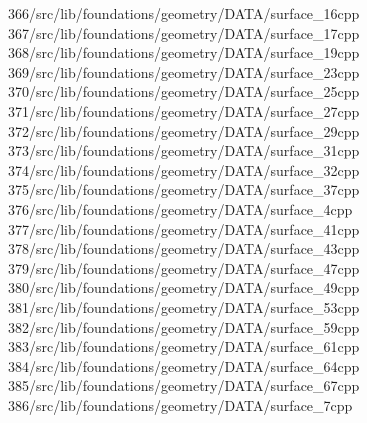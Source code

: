 \begin{tabbing}
366\>/src/lib/foundations/geometry/DATA/surface\_16cpp\\[0pt]
367\>/src/lib/foundations/geometry/DATA/surface\_17cpp\\[0pt]
368\>/src/lib/foundations/geometry/DATA/surface\_19cpp\\[0pt]
369\>/src/lib/foundations/geometry/DATA/surface\_23cpp\\[0pt]
370\>/src/lib/foundations/geometry/DATA/surface\_25cpp\\[0pt]
371\>/src/lib/foundations/geometry/DATA/surface\_27cpp\\[0pt]
372\>/src/lib/foundations/geometry/DATA/surface\_29cpp\\[0pt]
373\>/src/lib/foundations/geometry/DATA/surface\_31cpp\\[0pt]
374\>/src/lib/foundations/geometry/DATA/surface\_32cpp\\[0pt]
375\>/src/lib/foundations/geometry/DATA/surface\_37cpp\\[0pt]
376\>/src/lib/foundations/geometry/DATA/surface\_4cpp\\[0pt]
377\>/src/lib/foundations/geometry/DATA/surface\_41cpp\\[0pt]
378\>/src/lib/foundations/geometry/DATA/surface\_43cpp\\[0pt]
379\>/src/lib/foundations/geometry/DATA/surface\_47cpp\\[0pt]
380\>/src/lib/foundations/geometry/DATA/surface\_49cpp\\[0pt]
381\>/src/lib/foundations/geometry/DATA/surface\_53cpp\\[0pt]
382\>/src/lib/foundations/geometry/DATA/surface\_59cpp\\[0pt]
383\>/src/lib/foundations/geometry/DATA/surface\_61cpp\\[0pt]
384\>/src/lib/foundations/geometry/DATA/surface\_64cpp\\[0pt]
385\>/src/lib/foundations/geometry/DATA/surface\_67cpp\\[0pt]
386\>/src/lib/foundations/geometry/DATA/surface\_7cpp\\[0pt]

\end{tabbing}
